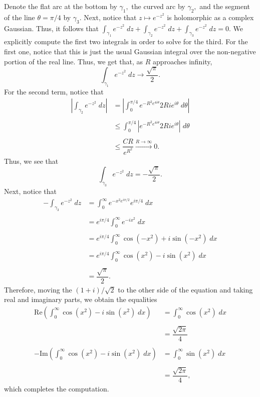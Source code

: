 \documentclass[12pt]{article}
\newenvironment{statement}[1]{\smallskip\noindent\color{black}{\bf #1.}}{}
\theoremstyle{definition}
\theoremstyle{remark}
\begin{document}
\begin{statement}{2.1}
Denote the flat arc at the bottom by $\gamma_{1},$ the curved arc by $\gamma_{2},$ and the segment of the line $\theta = \pi/4$ by $\gamma_{3}.$ Next, notice that $z \mapsto e^{-z^{2}}$ is holomorphic as a complex Gaussian. Thus, it follows that $\int_{\gamma_{1}}e^{-z^{2}}\;dz + \int_{\gamma_{2}}e^{-z^{2}}\;dz + \int_{\gamma_{3}}e^{-z^{2}}\;dz = 0.$ We explicitly compute the first two integrals in order to solve for the third. For the first one, notice that this is just the usual Gaussian integral over the non-negative portion of the real line. Thus, we get that, as $R$ approaches infinity, 
\[\int_{\gamma_{1}}e^{-z^{2}}\;dz \to \dfrac{\sqrt{\pi}}{2}.\]
For the second term, notice that
\begin{align*}
\left |\int_{\gamma_{2}}e^{-z^{2}}\;dz\right | &= \left |\int_{0}^{\pi/4}e^{-R^{2}e^{4i\theta}}2Rie^{i\theta}\;d\theta\right | \\\\
&\leq \int_{0}^{\pi/4}\left |e^{-R^{2}e^{4i\theta}}2Rie^{i\theta}\right |\;d\theta \\\\
&\leq \dfrac{CR}{e^{R^{2}}} \xrightarrow{R \to \infty} 0.
\end{align*}
Thus, we see that
\[\int_{\gamma_{3}}e^{-z^{2}}\;dz = -\dfrac{\sqrt{\pi}}{2}.\]
Next, notice that
\begin{align*}
-\int_{\gamma_{3}}e^{-z^{2}}\;dz &= \int_{0}^{\infty}e^{-x^{2}e^{i\pi/2}}e^{i\pi/4}\;dx \\\\
&= e^{i\pi/4}\int_{0}^{\infty}e^{-ix^{2}}\;dx \\\\
&= e^{i\pi/4}\int_{0}^{\infty}\cos(-x^{2}) + i\sin(-x^{2})\;dx \\\\
&= e^{i\pi/4}\int_{0}^{\infty}\cos(x^{2}) - i\sin(x^{2})\;dx \\\\
&= \dfrac{\sqrt{\pi}}{2}.
\end{align*}
Therefore, moving the $(1 + i)/\sqrt{2}$ to the other side of the equation and taking real and imaginary parts, we obtain the equalities
\begin{align*}
\text{Re}\left (\int_{0}^{\infty}\cos(x^{2}) - i\sin(x^{2})\;dx\right ) &= \int_{0}^{\infty}\cos(x^{2})\;dx \\\\
&= \dfrac{\sqrt{2\pi}}{4} \\\\
-\text{Im}\left (\int_{0}^{\infty}\cos(x^{2}) - i\sin(x^{2})\;dx\right ) &= \int_{0}^{\infty}\sin(x^{2})\;dx \\\\
&= \dfrac{\sqrt{2\pi}}{4},
\end{align*}
which completes the computation.
\end{statement}
\end{document}
